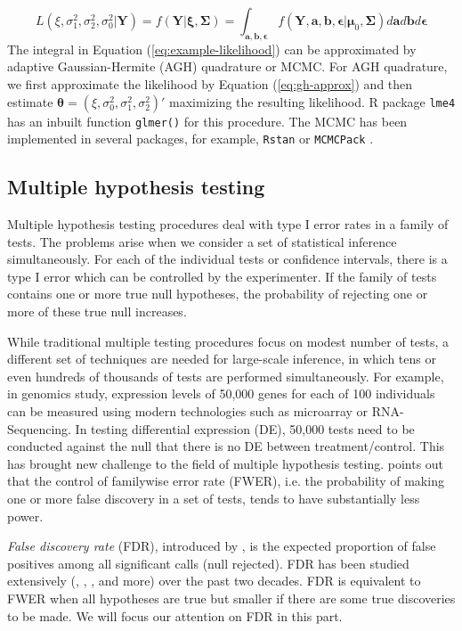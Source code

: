 	\begin{equation}\label{eq:example-likelihood}
	L(\xi, \sigma_1^2, \sigma_2^2, \sigma_0^2|\bm Y)=f(\bm Y|\bm \xi, \bm \Sigma)= \int_{\bm{a,b,\epsilon}} f(\bm Y, \bm a, \bm b, \bm \epsilon |\bm \mu_0, \bm \Sigma)d\bm a d \bm b d\bm \epsilon 
	\end{equation}
	The integral in Equation (\ref{eq:example-likelihood}) can be approximated by adaptive Gaussian-Hermite (AGH) quadrature or MCMC. For AGH quadrature, we first approximate the likelihood by Equation (\ref{eq:gh-approx}) and then estimate $\bm\theta = (\xi, \sigma_0^2, \sigma_1^2, \sigma_2^2)'$ maximizing the resulting likelihood. R package \verb"lme4" \citep{bates2012lme4} has an inbuilt function \verb"glmer()" for this procedure. The MCMC has been implemented in several packages, for example, \verb|Rstan| \citep{Rstan} or \verb|MCMCPack| \citep{martin2011mcmcpack}. 
	
	\subsection{Multiple hypothesis testing}
	Multiple hypothesis testing procedures deal with type I error rates in a family of tests. The problems arise when we consider a set of statistical inference simultaneously.  For each of the individual tests or confidence intervals, there is a type I error which can be controlled by the experimenter.  If the family of tests contains one or more true null hypotheses, the probability of rejecting one or more of these true null increases. 
	
	While traditional multiple testing procedures focus on modest number of tests, a different set of techniques are needed for large-scale inference, in which tens or even hundreds of thousands of tests are performed simultaneously. For example, in genomics study, expression levels of 50,000 genes for each of 100 individuals can be measured using modern technologies such as microarray or RNA-Sequencing. In testing differential expression (DE), 50,000 tests need to be conducted against the null that there is no DE between treatment/control. This has brought new challenge to the field of multiple hypothesis testing. \cite{benjamini1995controlling} points out that the control of familywise error rate (FWER), i.e. the probability of making one or more false discovery in a set of tests, tends to have substantially less power. 
	
	\textit{False discovery rate} (FDR), introduced by \cite{benjamini1995controlling}, is the expected proportion of false positives among all significant calls (null rejected). FDR has been studied extensively (\cite{benjamini2001control}, \cite{storey2003statistical}, \cite{efron2004large}, \cite{efron2010large} and more) over the past two decades.  FDR is equivalent to FWER \citep{benjamini1995controlling} when all hypotheses are true but smaller if there are some true discoveries to be made. We will focus our attention on FDR in this part. 
	

